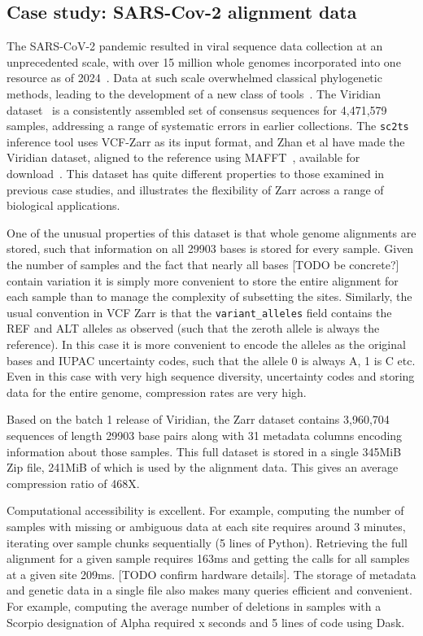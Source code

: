 \documentclass[a4paper,num-refs]{oup-contemporary}
\begin{document}
\subsection{Case study: SARS-Cov-2 alignment data}
The SARS-CoV-2 pandemic resulted in viral sequence data collection at 
an unprecedented scale, with over 15 million whole genomes incorporated into 
one resource as of 2024~\citep{hinrichs2024ongoing}. Data at such scale 
overwhelmed classical phylogenetic methods, leading to the development
of a new class of tools~\citep{turakhia2021ultrafast,ye2022matoptimize,zhan2023towards}. 
The Viridian dataset~\citep{hunt2024addressing} is a consistently assembled 
set of consensus sequences for 4,471,579 samples, addressing a range of systematic 
errors in earlier collections. The \texttt{sc2ts} inference tool uses VCF-Zarr as its 
input format, and Zhan et al have made the Viridian dataset,
aligned to the reference using MAFFT~\citep{katoh2013mafft},
available for download~\citep{zhan2023towards}. This dataset has quite
different properties to those examined in previous case studies, and 
illustrates the flexibility of Zarr across a range of biological applications.

One of the unusual properties of this dataset is that whole genome alignments 
are stored, such that information on all 29903 bases is stored for every 
sample. Given the number of samples and the fact that nearly all bases
[TODO be concrete?] contain variation it is simply more convenient to 
store the entire alignment for each sample than to manage the complexity
of subsetting the sites. Similarly, the usual convention in VCF Zarr 
is that the \texttt{variant\_alleles} field contains the REF and ALT 
alleles as observed (such that the zeroth allele is always the reference).
In this case it is more convenient to encode the alleles as the original
bases and IUPAC uncertainty codes, such that the allele 0 is always A, 1 is C etc.
Even in this case with very high sequence diversity, uncertainty codes and 
storing data for the entire genome, compression rates are very high.

Based on the batch 1 release of Viridian, the Zarr dataset contains
3,960,704 sequences of length 29903 base pairs along with 31 metadata columns
encoding information about those samples. This full dataset is stored in a
single 345MiB Zip file, 241MiB of which is used by the alignment data. This
gives an average compression ratio of 468X.

Computational accessibility is excellent. For example, computing the number of
samples with missing or ambiguous data at each site requires around 3 minutes,
iterating over sample chunks sequentially (5 lines of Python).
Retrieving the full alignment for a given sample requires 163ms and 
getting the calls for all samples at a given site 209ms. [TODO confirm hardware
details]. The storage of metadata and genetic data in a single file also
makes many queries efficient and convenient. For example, computing the 
average number of deletions in samples with a Scorpio designation of Alpha
required x seconds and 5 lines of code using Dask.
\end{document}
